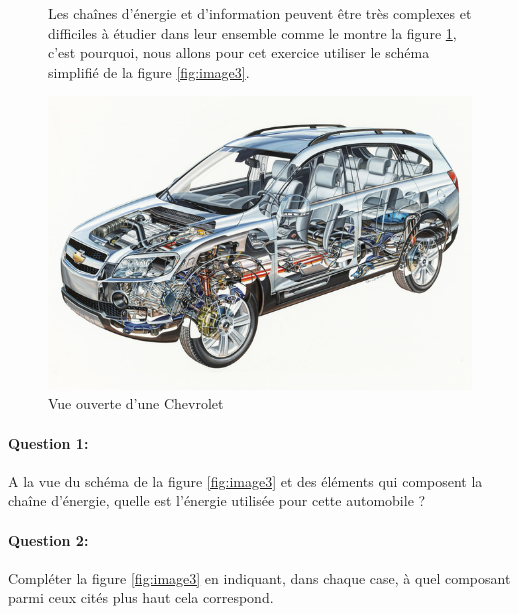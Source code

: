 \begin{figure}[htbp]
\begin{minipage}[c]{.45\linewidth}
Les chaînes d'énergie et d'information peuvent être très complexes et difficiles à étudier dans leur ensemble comme le montre la figure \ref{fig:image2}, c'est pourquoi, nous allons pour cet exercice utiliser le schéma simplifié de la figure \ref{fig:image3}.
\end{minipage}
\hfill
\begin{minipage}[c]{.5\linewidth}
\begin{center}
\includegraphics[width=\linewidth]{img/photo_41.jpg}
\caption{Vue ouverte d'une Chevrolet}
\label{fig:image2}
\end{center}
\end{minipage}
\end{figure}

\paragraph{Question 1:}

A la vue du schéma de la figure \ref{fig:image3} et des éléments qui composent la chaîne d'énergie, quelle est l'énergie utilisée pour cette automobile ?

\paragraph{Question 2:}

Compléter la figure \ref{fig:image3} en indiquant, dans chaque case, à quel composant parmi ceux cités plus haut cela correspond.

